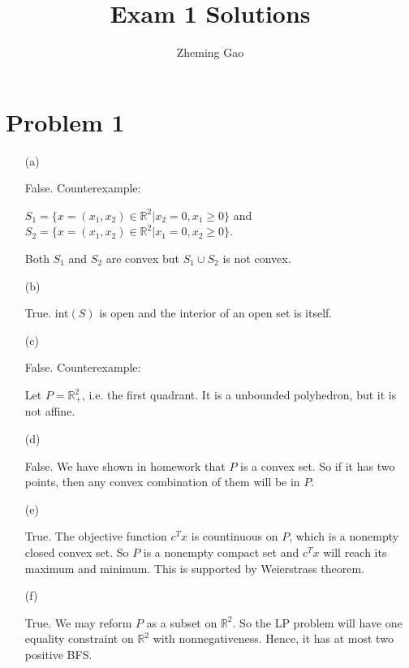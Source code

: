 \documentclass[12pt]{article}
\begin{document}
 
 
\title{Exam 1 Solutions}
\author{Zheming Gao}
\maketitle

\section*{Problem 1}

\begin{enumerate}
\item [(a)]

False. Counterexample:

$S_1 = \{ x = (x_1, x_2) \in \mathbb R^2 | x_2 = 0, x_1 \geqslant 0\}$ and $S_2 = \{ x = (x_1, x_2) \in \mathbb R^2 | x_1 = 0, x_2 \geqslant 0\}$.

Both $S_1$ and $S_2$ are convex but $S_1 \cup S_2$ is not convex.

\item[(b)]

True. int$(S)$ is open and the interior of an open set is itself.

\item [(c)]

False. Counterexample:

Let $P = \mathbb R_+^2$, i.e. the first quadrant. It is a unbounded polyhedron, but it is not affine. 

\item[(d)]

False. We have shown in homework that $P$ is a convex set. So if it has two points, then any convex combination of them will be in $P$.

\item[(e)]

True. The objective function $c^Tx$ is countinuous on $P$, which is a nonempty closed convex set. So $P$ is a nonempty compact set and $c^Tx$ will reach its maximum and minimum. This is supported by Weierstrass theorem.

\item[(f)]

True. We may reform $P$ as a subset on $\mathbb R^2$. So the LP problem will have one equality constraint on $\mathbb R^2$ with nonnegativeness. Hence, it has at most two positive BFS.


\end{enumerate}
\end{document}
